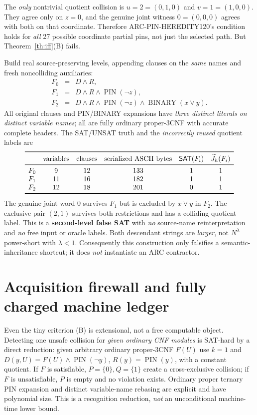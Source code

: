 \documentclass[11pt]{article}
\newcommand{\SAT}{\mathsf{SAT}}
\begin{document}
The \emph{only} nontrivial quotient collision is
$u=2=(0,1,0)$ and $v=1=(1,0,0)$.
They agree only on $z=0$, and the genuine joint
witness $0=(0,0,0)$ agrees with both on that coordinate.
Therefore ARC-PIN-HEREDITY120's condition holds for
\emph{all} 27 possible coordinate partial pins, not just
the selected path. But Theorem~\ref{th:iff}(B) fails.

Build real source-preserving levels, appending clauses on the
\emph{same} names and fresh noncolliding auxiliaries:
\[
\begin{array}{ccl}
F_0&=&D\land R,\\
F_1&=&D\land R\land\operatorname{PIN}(\neg z),\\
F_2&=&D\land R\land\operatorname{PIN}(\neg z)
        \land\operatorname{BINARY}(x\lor y).
\end{array}
\]
All original clauses and PIN/BINARY expansions have \emph{three
distinct literals on distinct variable names}; all are
fully ordinary proper-3CNF with accurate complete headers.
The SAT/UNSAT truth and the \emph{incorrectly reused} quotient
labels are
\[
\begin{array}{lccccc}
\toprule
 &\text{variables}&\text{clauses}&
 \text{serialized ASCII bytes}&\SAT(F_i)&\widetilde J_h(F_i)\\
\midrule
 F_0 &9 &12&133&1&1\\
 F_1 &11&16&182&1&1\\
 F_2 &12&18&201&0&1\\
\bottomrule
\end{array}
\]
The genuine joint word $0$ survives $F_1$ but is excluded by
$x\lor y$ in $F_2$. The exclusive pair $(2,1)$ survives both
restrictions and has a colliding quotient label. This is a
\textbf{second-level false SAT} with \emph{no} source-name
reinterpretation and \emph{no} free input or oracle labels.
Both descendant strings are \emph{larger}, not $N^\lambda$
power-short with $\lambda<1$. Consequently this construction
only falsifies a semantic-inheritance shortcut; it does
\emph{not} instantiate an ARC contractor.

\section{Acquisition firewall and fully charged machine ledger}
Even the tiny criterion (B) is extensional, not a free computable
object. Detecting one unsafe collision for \emph{given ordinary CNF
modules} is SAT-hard by a direct reduction: given arbitrary ordinary
proper-3CNF $F(U)$ use $k=1$ and
$D(y,U)=F(U)\land\operatorname{PIN}(\neg y)$,
$R(y)=\operatorname{PIN}(y)$, with a constant quotient.
If $F$ is satisfiable, $P=\{0\},Q=\{1\}$ create a
cross-exclusive collision; if $F$ is unsatisfiable, $P$
is empty and no violation exists. Ordinary proper ternary
PIN expansion and distinct variable-name rebasing are explicit
and have polynomial size. This is a recognition reduction,
\emph{not} an unconditional machine-time lower bound.
\end{document}
